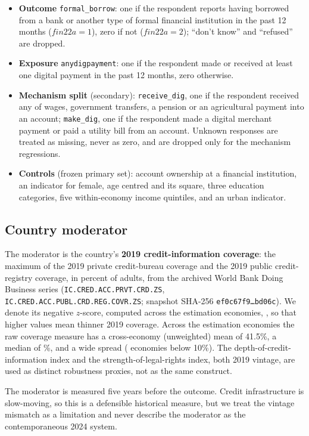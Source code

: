 \begin{itemize}
\item \textbf{Outcome} \texttt{formal\_borrow}: one if the respondent reports having
borrowed from a bank or another type of formal financial institution in the past 12 months
($\mathit{fin22a}=1$), zero if not ($\mathit{fin22a}=2$); ``don't know'' and ``refused'' are
dropped.
\item \textbf{Exposure} \texttt{anydigpayment}: one if the respondent made or received at
least one digital payment in the past 12 months, zero otherwise.
\item \textbf{Mechanism split} (secondary): \texttt{receive\_dig}, one if the respondent
received any of wages, government transfers, a pension or an agricultural payment into an
account; \texttt{make\_dig}, one if the respondent made a digital merchant payment or paid a
utility bill from an account. Unknown responses are treated as missing, never as zero, and
are dropped only for the mechanism regressions.
\item \textbf{Controls} (frozen primary set): account ownership at a financial institution,
an indicator for female, age centred and its square, three education categories, five
within-economy income quintiles, and an urban indicator.
\end{itemize}

\subsection{Country moderator}

The moderator is the country's \textbf{2019 credit-information coverage}: the maximum of the
2019 private credit-bureau coverage and the 2019 public credit-registry coverage, in percent
of adults, from the archived World Bank Doing Business series
(\texttt{IC.CRED.ACC.PRVT.CRD.ZS}, \texttt{IC.CRED.ACC.PUBL.CRD.REG.COVR.ZS}; snapshot
SHA-256 \texttt{ef0c67f9\ldots bd06c}). We denote its negative $z$-score, computed across
the estimation economies, \lowcovz, so that higher values mean thinner 2019 coverage.
Across the \NEconomies{} estimation economies the raw coverage measure has a cross-economy
(unweighted) mean of 41.5\%, a median of \SampleMedianCoverage\%, and a wide spread
(\ThinCoverageEconomies{} economies below 10\%). The depth-of-credit-information index and
the strength-of-legal-rights index, both 2019 vintage, are used as distinct robustness
proxies, not as the same construct.

The moderator is measured five years before the outcome. Credit infrastructure is
slow-moving, so this is a defensible historical measure, but we treat the vintage mismatch
as a limitation and never describe the moderator as the contemporaneous 2024 system.

